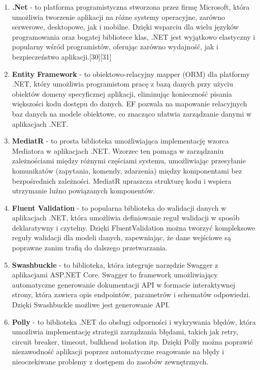 \begin{enumerate}

\item {\bf .Net} - to platforma programistyczna stworzona przez firmę Microsoft, która umożliwia tworzenie aplikacji na różne systemy operacyjne, zarówno serwerowe, desktopowe, jak i mobilne. Dzięki wsparciu dla wielu języków programowania oraz bogatej bibliotece klas, .NET jest wyjątkowo elastyczny i popularny wśród programistów, oferując zarówno wydajność, jak i bezpieczeństwo aplikacji.[30][31]

\item {\bf Entity Framework} - to obiektowo-relacyjny mapper (ORM) dla platformy .NET, który umożliwia programistom pracę z bazą danych przy użyciu obiektów domeny specyficznej aplikacji, eliminując konieczność pisania większości kodu dostępu do danych. EF pozwala na mapowanie relacyjnych baz danych na modele obiektowe, co znacząco ułatwia zarządzanie danymi w aplikacjach .NET.

\item {\bf MediatR} - to prosta biblioteka umożliwiająca implementację wzorca Mediatora w aplikacjach .NET. Wzorzec ten pomaga w zarządzaniu zależnościami między różnymi częściami systemu, umożliwiając przesyłanie komunikatów (zapytania, komendy, zdarzenia) między komponentami bez bezpośrednich zależności. MediatR upraszcza strukturę kodu i wspiera utrzymanie luźno powiązanych komponentów.

\item {\bf Fluent Validation} - to popularna biblioteka do walidacji danych w aplikacjach .NET, która umożliwia definiowanie reguł walidacji w sposób deklaratywny i czytelny. Dzięki FluentValidation można tworzyć kompleksowe reguły walidacji dla modeli danych, zapewniając, że dane wejściowe są poprawne zanim trafią do dalszego przetwarzania.

\item {\bf Swashbuckle} - to biblioteka, która integruje narzędzie Swagger z aplikacjami ASP.NET Core. Swagger to framework umożliwiający automatyczne generowanie dokumentacji API w formacie interaktywnej strony, która zawiera opis endpointów, parametrów i schematów odpowiedzi. Dzięki Swashbuckle możliwe jest generowanie API.

\item {\bf Polly} -  to biblioteka .NET do obsługi odporności i wykrywania błędów, która umożliwia implementację strategii zarządzania błędami, takich jak retry, circuit breaker, timeout, bulkhead isolation itp. Dzięki Polly można poprawić niezawodność aplikacji poprzez automatyczne reagowanie na błędy i nieoczekiwane problemy z dostępem do zasobów zewnętrznych.


\end{enumerate}
